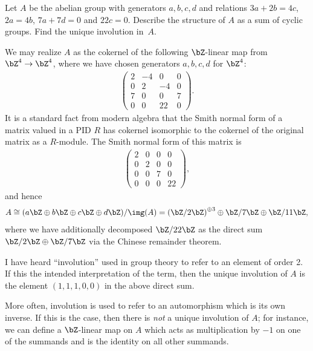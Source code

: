 \begin{homework}[e]
	\prob Let $A$ be the abelian group with generators $a,b,c,d$ and relations $3a+2b=4c$, $2a=4b$, $7a+7d=0$ and $22c=0$.  Describe the structure of $A$ as a sum of cyclic groups. Find the unique involution in~$A$.
	\begin{prf}
		We may realize $A$ as the cokernel of the following $\bZ$-linear map from $\bZ^4\to \bZ^4$, where we have chosen generators $a,b,c,d$ for $\bZ^4$:
		\begin{align*}
			\begin{pmatrix}	
				2 & -4 & 0 & 0 \\
				0 & 2 & -4 & 0 \\
				7 & 0 & 0 & 7 \\
				0 & 0 & 22 & 0
			\end{pmatrix}.
		\end{align*}
		It is a standard fact from modern algebra that the Smith normal form of a matrix valued in a PID $R$ has cokernel isomorphic to the cokernel of the original matrix as a $R$-module. The Smith normal form of this matrix is
		\begin{align*}
			\begin{pmatrix}	
				2 & 0 & 0 & 0 \\
				0 & 2 & 0 & 0 \\
				0 & 0 & 7 & 0 \\
				0 & 0 & 0 & 22
			\end{pmatrix},
		\end{align*}
		and hence
		\begin{align*}
			A \cong (a\bZ \oplus b\bZ \oplus c\bZ \oplus d\bZ)/\img(A) = \left(\bZ/2\bZ\right)^{\oplus 3} \oplus \bZ/7\bZ \oplus \bZ/11\bZ,
		\end{align*}
		where we have additionally decomposed $\bZ/22\bZ$ as the direct sum $\bZ/2\bZ\oplus \bZ/7\bZ$ via the Chinese remainder theorem.

		I have heard ``involution'' used in group theory to refer to an element of order 2. If this the intended interpretation of the term, then the unique involution of $A$ is the element $(1,1,1,0,0)$ in the above direct sum.

		More often, involution is used to refer to an automorphism which is its own inverse. If this is the case, then there is \emph{not} a unique involution of $A$; for instance, we can define a $\bZ$-linear map on $A$ which acts as multiplication by $-1$ on one of the summands and is the identity on all other summands. 
	\end{prf}


\end{homework}
